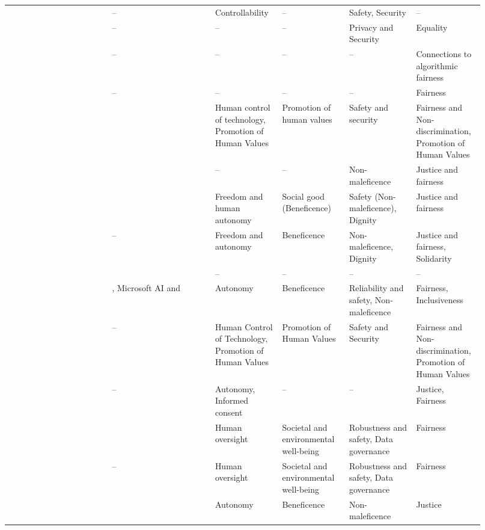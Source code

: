 \begin{landscape}
\begin{ThreePartTable}
\begin{longtable}{P{0.2\linewidth}P{0.2\linewidth}P{0.13\linewidth}P{0.13\linewidth}P{0.13\linewidth}P{0.13\linewidth}}
        \textcite{Gianni_2022} & -- & Controllability & -- & Safety, Security & -- \\ 
        \textcite{Gupta_2021} & -- & -- & -- & Privacy and Security & Equality \\ 
        \textcite{Hacker_2022} & -- & -- & -- & -- & Connections to \mbox{algorithmic} fairness \\ 
        \textcite{Hagendorff_2020} & -- & -- & -- & -- & Fairness \\ 
        \textcite{Havrda_2020} & \textcite{Fjeld_2020} & Human control of \mbox{technology}, \mbox{Promotion} of Human Values & Promotion of human values & Safety and security & Fairness and \mbox{Non-discrimination}, Promotion of Human Values \\ 
        \textcite{Henriksen_2021} & \textcite{Jobin_2019} & -- & -- & Non-maleficence & Justice and fairness \\ 
        \textcite{Jakesch_2022} & \textcite{Jobin_2019} & Freedom and human autonomy & Social good (\mbox{Beneficence})\tnote{*} & Safety (Non-maleficence)\tnote{*}, Dignity & Justice and fairness \\ 
        \textcite{Jobin_2019} & -- & Freedom and autonomy & Beneficence & Non-maleficence, \mbox{Dignity} & Justice and fairness, Solidarity \\ 
        \textcite{Kumar_2021} & \textcite{Dignum_2017} & -- & -- & -- & -- \\ 
        \textcite{Liu_2021} & \textcite{Clarke_2019}, Microsoft AI and \textcite{Floridi_2018} & Autonomy & Beneficence & Reliability and safety, Non-maleficence & Fairness, Inclusiveness \\ 
        \textcite{Lu_2022} & -- & Human Control of Technology, Promotion of Human Values & Promotion of Human Values & Safety and Security & Fairness and Non-discrimination, \mbox{Promotion} of Human Values \\ 
        \textcite{Lukkien_2021} & -- & Autonomy, Informed consent & -- & -- & Justice, Fairness \\ 
        \textcite{Merhi_2022} & \textcite{Mikalef_2022} & Human oversight & Societal and environmental well-being & Robustness and safety, Data \mbox{governance} & Fairness \\ 
        \textcite{Mikalef_2022} & -- & Human oversight & Societal and environmental well-being & Robustness and safety, Data \mbox{governance} & Fairness \\ 
        \textcite{Morley_2020} & \textcite{Floridi_2018} & Autonomy & Beneficence & Non-maleficence & Justice \\ 

\end{longtable}
\end{ThreePartTable}
\end{landscape}
